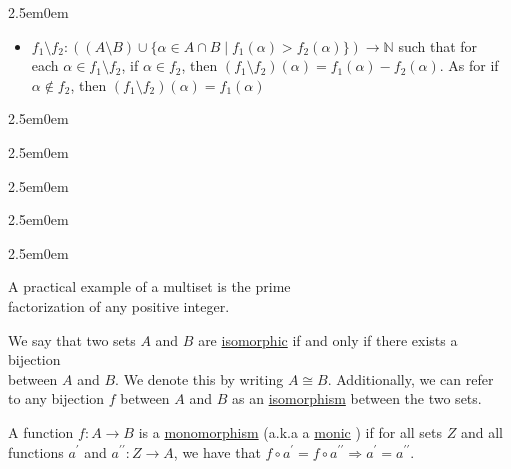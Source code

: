 \documentclass{book}
\newcommand{\hOne}{%
   \color{Black}%
   \fontsize{14}{16}\selectfont%
}
\newcommand{\myComment}{%
   \color{RawerSienna}%
   \fontsize{12}{14}\selectfont%
}
\newenvironment{myIndent}{%
   \begin{adjustwidth}{2.5em}{0em}%
}{%
   \end{adjustwidth}%
}
\newcommand{\udefine}[1]{{%
   \setulcolor{Red}%
   \setul{0.14em}{0.07em}%
   \ul{#1}%
}}
\newcommand{\pprime}{{\prime\prime}}
\begin{document}
\begin{myIndent}
\begin{itemize}
         \item \(f_{1} \setminus f_{2}: ((A \setminus B)
               \cup \{\alpha \in A \cap B \mid f_{1}(\alpha) >
               f_{2}(\alpha)\}) \longrightarrow \mathbb{N} \) 
               such that for\\ each \(\alpha \in f_{1} \setminus f_{2}\), 
               if \(\alpha \in f_{2} \), then \((f_{1} \setminus f_{2})(\alpha) 
               = f_{1}(\alpha) - f_{2}(\alpha)\). As for if\\ \(\alpha 
               \notin f_{2} \), then \((f_{1} \setminus f_{2})(\alpha) = 
               f_{1}(\alpha)\)\\ [-12pt]
         
      \end{itemize}
   
      \begin{myIndent}\begin{myIndent}\begin{myIndent}
      \begin{myIndent}\begin{myIndent}
         \myComment
         \hfill \break
         A practical example of a multiset is the prime
         \\factorization of any positive integer.
      \end{myIndent}\end{myIndent}\end{myIndent}
      \end{myIndent}\end{myIndent}
   
   \end{myIndent}

   \hrulefill

   \hOne
   \hfill \break
   We say that two sets $A$ and $B$ are \udefine{isomorphic} if and only
   if there exists a bijection\\ between $A$ and $B$. We denote this by
   writing $A \cong B$. Additionally, we can refer\\ to any bijection $f$
   between $A$ and $B$ as an \udefine{isomorphism} between the two sets.

   \hfill \break
   A function $f: A \rightarrow B$ is a \udefine{monomorphism} (a.k.a 
   a \udefine{monic}) if for all sets $Z$ and all\\ functions $a^{\prime}$
   and $a^{\pprime}: Z \rightarrow A$, we have that $f \circ a^{\prime}
   = f \circ a^{\pprime} \Longrightarrow a^{\prime} = a^{\pprime}$.
\end{document}
